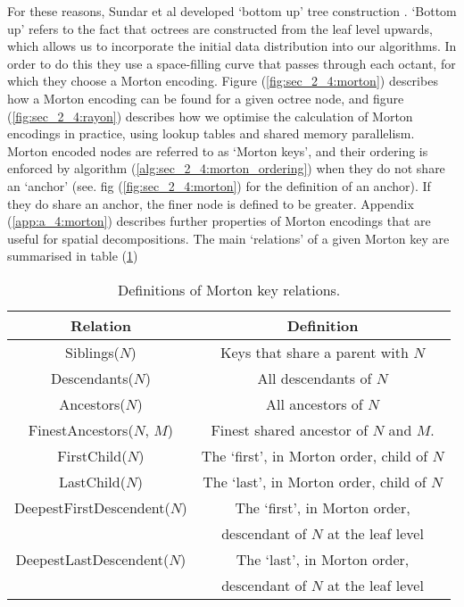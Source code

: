 For these reasons, Sundar et al developed `bottom up' tree construction \cite{sundar2008bottom}. `Bottom up' refers to the fact that octrees are constructed from the leaf level upwards, which allows us to incorporate the initial data distribution into our algorithms. In order to do this they use a space-filling curve that passes through each octant, for which they choose a Morton encoding. Figure (\ref{fig:sec_2_4:morton}) describes how a Morton encoding can be found for a given octree node, and figure (\ref{fig:sec_2_4:rayon}) describes how we optimise the calculation of Morton encodings in practice, using lookup tables and shared memory parallelism. Morton encoded nodes are referred to as `Morton keys', and their ordering is enforced by algorithm (\ref{alg:sec_2_4:morton_ordering}) when they do not share an `anchor' (see. fig (\ref{fig:sec_2_4:morton}) for the definition of an anchor). If they do share an anchor, the finer node is defined to be greater. Appendix (\ref{app:a_4:morton}) describes further properties of Morton encodings that are useful for spatial decompositions. The main `relations' of a given Morton key are summarised in table (\ref{table:sec_2_4:morton})

\begin{table}[h!]
    \centering
    \begin{tabular}{||c c||} 
        \hline
        Relation & Definition \\ [0.5ex]
        \hline\hline
        Siblings($N$) & Keys that share a parent with $N$  \\
        Descendants($N$) & All descendants of $N$  \\
        Ancestors($N$) & All ancestors of $N$  \\
        FinestAncestors($N$, $M$) & Finest shared ancestor of $N$ and $M$.  \\
        FirstChild($N$) & The `first', in Morton order, child of $N$  \\
        LastChild($N$) & The `last', in Morton order, child of $N$  \\
        DeepestFirstDescendent($N$) & The `first', in Morton order,  \\ 
         &  descendant of $N$ at the leaf level \\
        DeepestLastDescendent($N$) & The `last', in Morton order, \\
         & descendant of $N$ at the leaf level \\
        
        \hline
    \end{tabular}
    \caption{Definitions of Morton key relations.}
    \label{table:sec_2_4:morton}
\end{table}

